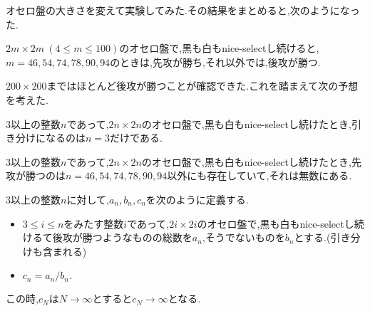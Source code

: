 \documentclass[a4paper,10pt]{ltjsarticle}
\begin{document}
\begin{appendices}
オセロ盤の大きさを変えて実験してみた.その結果をまとめると,次のようになった.
\begin{tcolorbox}[colback=white,colframe=black]
  \begin{prop}
    $2m\times2m\ (4\leqslant m \leqslant 100)$のオセロ盤で,黒も白もnice-selectし続けると,$m= 46,54, 74, 78, 90, 94$のときは,先攻が勝ち,それ以外では,後攻が勝つ.
  \end{prop}
\end{tcolorbox}


$200\times200$まではほとんど後攻が勝つことが確認できた.これを踏まえて次の予想を考えた.

\begin{tcolorbox}[colback=blue!5,colframe=blue]
  \begin{conj}\label{conj:1}
    $3$以上の整数$n$であって,$2n\times2n$のオセロ盤で,黒も白もnice-selectし続けたとき,引き分けになるのは$n=3$だけである.
  \end{conj}
\end{tcolorbox}

\begin{tcolorbox}[colback=blue!5,colframe=blue]
  \begin{conj}\label{conj:2}
    $3$以上の整数$n$であって,$2n\times2n$のオセロ盤で,黒も白もnice-selectし続けたとき,先攻が勝つのは$n=46,54,74, 78, 90, 94$以外にも存在していて,それは無数にある.
  \end{conj}
\end{tcolorbox}
\begin{tcolorbox}[colback=blue!5,colframe=blue]
  \begin{conj}\label{conj:3}
    $3$以上の整数$n$に対して,$a_n, b_n, c_n$を次のように定義する.
    \begin{itemize}
      \item $3 \leqslant i \leqslant n$をみたす整数$i$であって,$2i\times2i$のオセロ盤で,黒も白もnice-selectし続けるて後攻が勝つようなものの総数を$a_n$,そうでないものを$b_n$とする.(引き分けも含まれる)
      \item $c_n = a_n / b_n. $
    \end{itemize}
    この時,$c_N$は$N\to \infty$とすると$c_N \to \infty$となる.
  \end{conj}
\end{tcolorbox}


\end{appendices}
\end{document}
